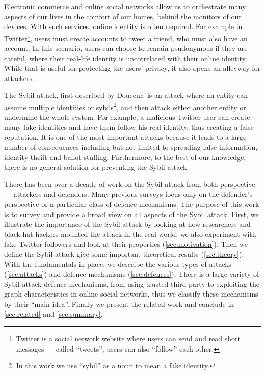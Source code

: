 Electronic commerce and online social networks allow us to orchestrate many
aspects of our lives in the comfort of our homes, behind the monitors of our
devices. With such services, online identity is often required. For example in
Twitter\footnote{Twitter is a social network website where users can send and
  read short messages --- called ``tweets'', users can also ``follow'' each
  other.}, users must create accounts to tweet a friend, who must also have an
account. In this scenario, users can choose to remain psudonymous if they are
careful, where their real-life identity is uncorrelated with their online
identity. While that is useful for protecting the users' privacy, it also opens
an alleyway for attackers.

The Sybil attack, first described by Douceur\cite{douceur2002sybil}, is an
attack where an entity can assume multiple identities or sybils\footnote{In this
  work we use ``sybil'' as a noun to mean a fake identity.}, and then attack
either another entity or undermine the whole system. For example, a malicious
Twitter user can create many fake identities and have them follow his real
identity, thus creating a false reputation. It is one of the most important
attacks because it leads to a large number of consequences including but not
limited to spreading false information, identity theift\cite{bilge2009all} and
ballot stuffing\cite{bhattacharjee2005avoiding}. Furthermore, to the best of our
knowledge, there is no general solution for preventing the Sybil attack.

There has been over a decade of work on the Sybil attack from both perspective
--- attackers and defenders. Many previous surveys focus only on the defender's
perspective or a particular class of defence mechanisms. The purpose of this
work is to survey and provide a broad view on all aspects of the Sybil attack.
First, we illustrate the importance of the Sybil attack by looking at how
researchers and black-hat hackers mounted the attack in the real-world; we also
experiment with fake Twitter followers and look at their properties
(\autoref{sec:motivation}). Then we define the Sybil attack give some important
theoretical results (\autoref{sec:theory}). With the fundamentals in place, we
describe the various types of attacks (\autoref{sec:attacks}) and defence
mechanisms (\autoref{sec:defences}). There is a large variety of Sybil attack
defence mechanisms, from using trusted-third-party to exploiting the graph
characteristics in online social networks, thus we classify these mechanisms by
their ``main idea''. Finally we present the related work and conclude in
\autoref{sec:related} and \autoref{sec:summary}.

